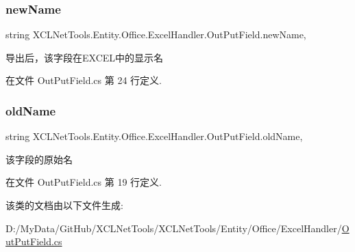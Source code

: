 \subsubsection{\texorpdfstring{new\+Name}{newName}}
{\footnotesize\ttfamily string X\+C\+L\+Net\+Tools.\+Entity.\+Office.\+Excel\+Handler.\+Out\+Put\+Field.\+new\+Name\hspace{0.3cm}{\ttfamily [get]}, {\ttfamily [set]}}



导出后，该字段在\+E\+X\+C\+E\+L中的显示名 



在文件 Out\+Put\+Field.\+cs 第 24 行定义.

\mbox{\label{class_x_c_l_net_tools_1_1_entity_1_1_office_1_1_excel_handler_1_1_out_put_field_a6f62cc17246410ac6f6a352cd04bc1a2}} 
\subsubsection{\texorpdfstring{old\+Name}{oldName}}
{\footnotesize\ttfamily string X\+C\+L\+Net\+Tools.\+Entity.\+Office.\+Excel\+Handler.\+Out\+Put\+Field.\+old\+Name\hspace{0.3cm}{\ttfamily [get]}, {\ttfamily [set]}}



该字段的原始名 



在文件 Out\+Put\+Field.\+cs 第 19 行定义.



该类的文档由以下文件生成\+:\begin{DoxyCompactItemize}
\item 
D\+:/\+My\+Data/\+Git\+Hub/\+X\+C\+L\+Net\+Tools/\+X\+C\+L\+Net\+Tools/\+Entity/\+Office/\+Excel\+Handler/\hyperlink{_out_put_field_8cs}{Out\+Put\+Field.\+cs}\end{DoxyCompactItemize}
